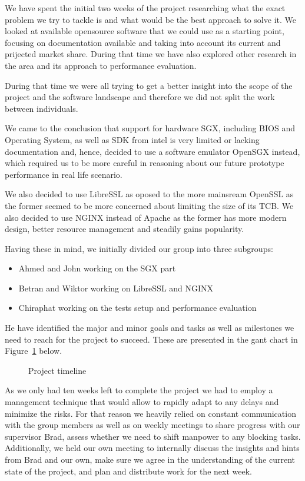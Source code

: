 \documentclass[../main.tex]{subfiles}
\begin{document}
We have spent the initial two weeks of the project researching what the exact
problem we try to tackle is and what would be the best approach to solve it.
We looked at available opensource software that we could use as a starting
point, focusing on documentation available and taking into account its current
and prijected market share. During that time we have also explored other
research in the area and its approach to performance evaluation.

During that time we were all trying to get a better insight into the scope of
the project and the software landscape and therefore we did not split the work
between individuals.

We came to the conclusion that support for hardware SGX, including BIOS and
Operating System, as well as SDK from intel is very limited or lacking
documentation and, hence, decided to use a software emulator OpenSGX instead,
which required us to be more careful in reasoning about our future prototype
performance in real life scenario.

We also decided to use LibreSSL as oposed to the more mainsream OpenSSL as the
former seemed to be more concerned about limiting the size of its TCB. We also
decided to use NGINX instead of Apache as the former has more modern design,
better resource management and steadily gains popularity.

Having these in mind, we initially divided our group into three subgroups:
\begin{itemize}
	\item Ahmed and John working on the SGX part
	\item Betran and Wiktor working on LibreSSL and NGINX
	\item Chiraphat working on the tests setup and performance evaluation
\end{itemize}

He have identified the major and minor goals and tasks as well as milestones
we need to reach for the project to succeed. These are presented in the gant
chart in Figure~\ref{fig:gantchart} below.

\begin{figure}[H]
  \centering
  \caption{Project timeline}
  \label{fig:gantchart}
\end{figure}

As we only had ten weeks left to complete the project we had to employ
a management technique that would allow to rapidly adapt to any delays and
minimize the risks. For that reason we heavily relied on constant
communication with the group members as well as on weekly meetings to share
progress with our supervisor Brad, assess whether we need to shift manpower to
any blocking tasks. Additionally, we held our own meeting to internally
discuss the insights and hints from Brad and our own, make sure we agree in the
understanding of the current state of the project, and plan and distribute
work for the next week.\\
\end{document}
